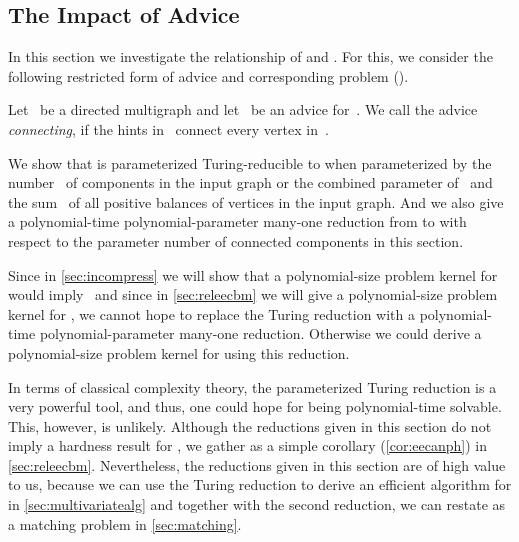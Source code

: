 \subsection{The Impact of Advice}\label{sec:wmeeslasha}

In this section we investigate the relationship of \pWMEEs{} and \pWMEEAs{}. For this, we consider the following restricted form of advice and corresponding problem \pWMEECA{} (\pWMEECAs{}).
\begin{definition}
  Let~ be a directed multigraph and let~ be an advice for~. We call the advice~ \emph{connecting}, if the hints in~ connect every vertex in~.
\end{definition}
 \label{def:pWMEECA}

We show that \pWMEEs{} is parameterized Turing-reducible to \pWMEECAs{} when parameterized by the number~ of components in the input graph or the combined parameter of~ and the sum~ of all positive balances of vertices in the input graph. And we also give a polynomial-time polynomial-parameter many-one reduction from \pWMEEAs{} to \pWMEEs{} with respect to the parameter number of connected components in this section. 

Since in \autoref{sec:incompress} we will show that a polynomial-size problem kernel for \pWMEEs{} would imply~ and since in \autoref{sec:releecbm} we will give a polynomial-size problem kernel for \pWMEECAs{}, we cannot hope to replace the Turing reduction with a polynomial-time polynomial-parameter many-one reduction. Otherwise we could derive a polynomial-size problem kernel for \pWMEEs{} using this reduction. 

In terms of classical complexity theory, the parameterized Turing reduction is a very powerful tool, and thus, one could hope for \pWMEECAs{} being polynomial-time solvable. This, however, is unlikely. Although the reductions given in this section do not imply a hardness result for \pWMEECAs{}, we gather \NPhs{} as a simple corollary (\autoref{cor:eecanph}) in \autoref{sec:releecbm}. Nevertheless, the reductions given in this section are of high value to us, because we can use the Turing reduction to derive an efficient algorithm for \pWMEEs{} in \autoref{sec:multivariatealg} and together with the second reduction, we can restate \pWMEEs{} as a matching problem in \autoref{sec:matching}.

